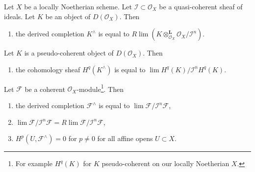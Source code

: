 \begin{lemma}
\label{lemma-derived-completion-pseudo-coherent}
Let $X$ be a locally Noetherian scheme. Let $\mathcal{I} \subset \mathcal{O}_X$
be a quasi-coherent sheaf of ideals.
Let $K$ be an object of $D(\mathcal{O}_X)$. Then
\begin{enumerate}
\item the derived completion $K^\wedge$ is equal to
$R\lim (K \otimes_{\mathcal{O}_X}^\mathbf{L} \mathcal{O}_X/\mathcal{I}^n)$.
\end{enumerate}
Let $K$ is a pseudo-coherent object of $D(\mathcal{O}_X)$. Then
\begin{enumerate}
\item[(2)] the cohomology sheaf $H^q(K^\wedge)$ is equal to
$\lim H^q(K)/\mathcal{I}^nH^q(K)$.
\end{enumerate}
Let $\mathcal{F}$ be a coherent $\mathcal{O}_X$-module\footnote{For example
$H^q(K)$ for $K$ pseudo-coherent on our locally Noetherian $X$.}. Then
\begin{enumerate}
\item[(3)] the derived completion $\mathcal{F}^\wedge$ is equal to
$\lim \mathcal{F}/\mathcal{I}^n\mathcal{F}$,
\item[(4)]
$\lim \mathcal{F}/\mathcal{I}^n \mathcal{F} =
R\lim \mathcal{F}/\mathcal{I}^n \mathcal{F}$,
\item[(5)] $H^p(U, \mathcal{F}^\wedge) = 0$ for $p \not = 0$ for all
affine opens $U \subset X$.
\end{enumerate}
\end{lemma}

